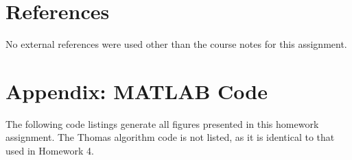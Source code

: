 \documentclass[11pt]{article}
\begin{document}
\section{References} %

No external references were used other than the course notes for this assignment.

\section*{Appendix: MATLAB Code} %

The following code listings generate all figures presented in this homework assignment. The Thomas algorithm code is not listed, as it is identical to that used in Homework 4.


\end{document}

